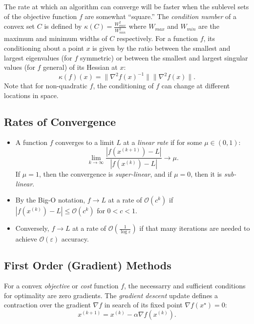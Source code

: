 \documentclass[12pt]{article}
\begin{document}
The rate at which an algorithm can converge will be faster when the sublevel 
sets of the objective function $f$ are somewhat ``square.''
The {\it condition number} of a convex set $C$ is defined by
$\kappa(C) = \frac{W_{max}^2}{W_{min}^2}$ where $W_{max}$
and $W_{min}$ are the maximum and minimum widths of $C$ respectively.
For a function $f$, its conditioning about a point $x$ is given by the
ratio between the smallest and largest eigenvalues (for $f$ symmetric)
or between the smallest and largest singular values (for $f$ general) of
its Hessian at $x$:
$$
\kappa(f)(x) = \|\nabla^2 f(x)^{-1}\|\|\nabla^2 f(x)\|.
$$
Note that for non-quadratic $f$, the conditioning of $f$ can change
at different locations in space.

\subsection*{Rates of Convergence}

\begin{itemize}
\item A function $f$ converges to a limit $L$ at a {\it linear rate}
if for some $\mu \in (0,1)$:
$$
\lim_{k\rightarrow\infty}\frac{|f(x^{(k+1)})-L|}
{|f(x^{(k)})-L|} \rightarrow \mu.
$$
If $\mu = 1$, then the convergence is {\it super-linear}, and
if $\mu = 0$, then it is {\it sub-linear}.
\item By the Big-O notation, $f\rightarrow L$ at a rate of 
$\mathcal{O}(c^k)$ if
$|f(x^{(k)}) - L| \leq \mathcal{O}(c^k)$ for $0 < c < 1$.
\item Conversely, $f\rightarrow L$ at a rate of 
$\mathcal{O}(\frac{1}{\log\varepsilon})$ if that many iterations are needed to 
achieve $\mathcal{O}(\varepsilon)$ accuracy.
\end{itemize}

\subsection*{First Order (Gradient) Methods}

For a convex {\it objective} or {\it cost} function $f$, 
the necessarry and sufficient conditions
for optimality are zero gradients.
The {\it gradient descent} update defines a contraction over the gradient 
$\nabla f$ in search of its fixed point $\nabla f(x^\star) = 0$:
\begin{equation}
\label{gd}
x^{(k+1)} = x^{(k)} - \alpha \nabla f(x^{(k)}).
\end{equation}
\end{document}
